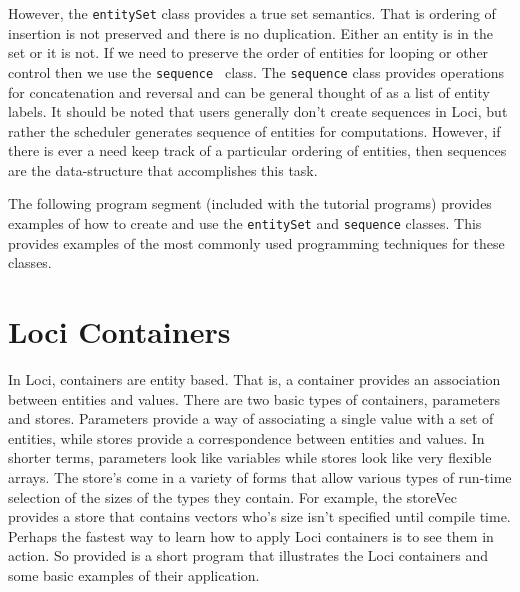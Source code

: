 \documentclass[10pt,epsf]{book}
\begin{document}
However, the {\tt entitySet} class provides a true set semantics.
That is ordering of insertion is not preserved and there is no
duplication.  Either an entity is in the set or it is not.  If we need
to preserve the order of entities for looping or other control then we
use the {\tt sequence } class.  The {\tt sequence} class provides
operations for concatenation and reversal and can be general thought
of as a list of entity labels.  It should be noted that users
generally don't create sequences in Loci, but rather the scheduler
generates sequence of entities for computations.  However, if there is
ever a need keep track of a particular ordering of entities, then
sequences are the data-structure that accomplishes this task.

The following program segment (included with the tutorial programs)
provides examples of how to create and use the {\tt  entitySet} and
{\tt sequence} classes.  This provides examples of the most commonly
used programming techniques for these classes.



\section{Loci Containers}

In Loci, containers are entity based.  That is, a container provides
an association between entities and values.  There are two basic types
of containers, parameters and stores.  Parameters provide a way of
associating a single value with a set of entities, while stores
provide a correspondence between entities and values.  In shorter
terms, parameters look like variables while stores look like very
flexible arrays.  The store's come in a variety of forms that allow
various types of run-time selection of the sizes of the types they
contain.  For example, the storeVec provides a store that contains
vectors who's size isn't specified until compile time.  Perhaps the
fastest way to learn how to apply Loci containers is to see them in
action.  So provided is a short program that illustrates the Loci
containers and some basic examples of their application.


\end{document}

